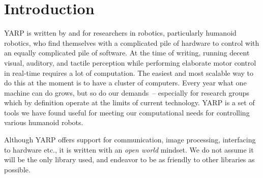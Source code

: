 \section{Introduction}

YARP is written by and for researchers in robotics, particularly
humanoid robotics, who find themselves with a complicated pile of
hardware to control with an equally complicated pile of software. 
%
At the time of writing, running decent visual, auditory, and tactile
perception while performing elaborate motor control in real-time
requires a lot of computation. The easiest and most scalable way to do
this at the moment is to have a cluster of computers. Every year what
one machine can do grows, but so do our demands~-- especially for
research groups which by definition operate at the limits of current
technology. YARP is a set of tools we have found useful for meeting
our computational needs for controlling various humanoid robots.

Although YARP offers support for communication, image processing,
interfacing to hardware etc., it is written with an {\em open world}
mindset.  We do not assume it will be the only library used, and
endeavor to be as friendly to other libraries as possible.


